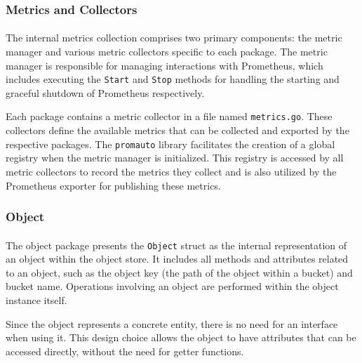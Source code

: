 \documentclass[12pt, conference, final, a4paper, onecolumn, compsoc]{IEEEtran}
\begin{document}
\paragraph{}

\subsubsection*{Metrics and Collectors}
\paragraph{}

The internal metrics collection comprises two primary components: the metric
manager and various metric collectors specific to each package. The metric
manager is responsible for managing interactions with Prometheus, which includes
executing the \texttt{Start} and \texttt{Stop} methods for handling the starting
and graceful shutdown of Prometheus respectively.

Each package contains a metric collector in a file named \texttt{metrics.go}.
These collectors define the available metrics that can be collected and exported
by the respective packages. The \texttt{promauto} library facilitates the
creation of a global registry when the metric manager is initialized. This
registry is accessed by all metric collectors to record the metrics they collect
and is also utilized by the Prometheus exporter for publishing these metrics.

\subsubsection*{Object}
\paragraph{}

The object package presents the \texttt{Object} struct as the internal
representation of an object within the object store. It includes all methods and
attributes related to an object, such as the object key (the path of the object
within a bucket) and bucket name.
Operations involving an object are performed within the object instance itself.

Since the object represents a concrete entity, there is no need for an interface
when using it. This design choice allows the object to have attributes that can
be accessed directly, without the need for getter functions.
\end{document}
